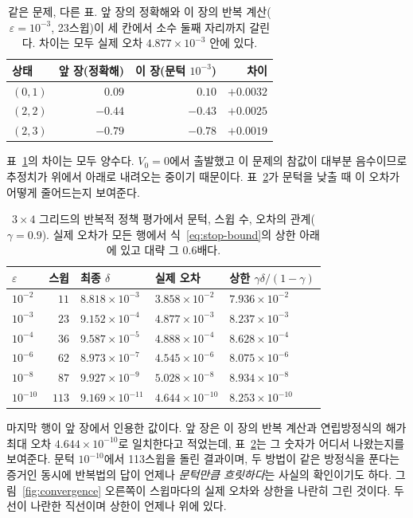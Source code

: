 \documentclass[11pt,a4paper]{article}
\begin{document}
\begin{table}[htbp]
\centering
\caption{같은 문제, 다른 표. 앞 장의 정확해와 이 장의 반복 계산($\varepsilon=10^{-3}$, 23스윕)이
세 칸에서 소수 둘째 자리까지 갈린다. 차이는 모두 실제 오차 $4.877\times10^{-3}$ 안에 있다.}
\label{tab:mismatch}
\small
\begin{tabular}{@{}lrrr@{}}
\toprule
상태 & 앞 장(정확해) & 이 장(문턱 $10^{-3}$) & 차이 \\
\midrule
$(0,1)$ & $0.09$  & $0.10$  & $+0.0032$ \\
$(2,2)$ & $-0.44$ & $-0.43$ & $+0.0025$ \\
$(2,3)$ & $-0.79$ & $-0.78$ & $+0.0019$ \\
\bottomrule
\end{tabular}
\end{table}

표~\ref{tab:mismatch}의 차이는 모두 양수다. $V_0=0$에서 출발했고 이 문제의 참값이 대부분 음수이므로
추정치가 위에서 아래로 내려오는 중이기 때문이다. 표~\ref{tab:threshold}가 문턱을 낮출 때 이 오차가
어떻게 줄어드는지 보여준다.

\begin{table}[htbp]
\centering
\caption{$3\times4$ 그리드의 반복적 정책 평가에서 문턱, 스윕 수, 오차의 관계($\gamma=0.9$).
실제 오차가 모든 행에서 식~\eqref{eq:stop-bound}의 상한 아래에 있고 대략 그 $0.6$배다.}
\label{tab:threshold}
\small
\begin{tabular}{@{}lrlll@{}}
\toprule
$\varepsilon$ & 스윕 & 최종 $\delta$ & 실제 오차 & 상한 $\gamma\delta/(1-\gamma)$ \\
\midrule
$10^{-2}$  & $11$  & $8.818\times10^{-3}$  & $3.858\times10^{-2}$  & $7.936\times10^{-2}$ \\
$10^{-3}$  & $23$  & $9.152\times10^{-4}$  & $4.877\times10^{-3}$  & $8.237\times10^{-3}$ \\
$10^{-4}$  & $36$  & $9.587\times10^{-5}$  & $4.888\times10^{-4}$  & $8.628\times10^{-4}$ \\
$10^{-6}$  & $62$  & $8.973\times10^{-7}$  & $4.545\times10^{-6}$  & $8.075\times10^{-6}$ \\
$10^{-8}$  & $87$  & $9.927\times10^{-9}$  & $5.028\times10^{-8}$  & $8.934\times10^{-8}$ \\
$10^{-10}$ & $113$ & $9.169\times10^{-11}$ & $4.644\times10^{-10}$ & $8.253\times10^{-10}$ \\
\bottomrule
\end{tabular}
\end{table}

마지막 행이 앞 장에서 인용한 값이다. 앞 장은 이 장의 반복 계산과 연립방정식의 해가 최대 오차
$4.644\times10^{-10}$로 일치한다고 적었는데, 표~\ref{tab:threshold}는 그 숫자가 어디서 나왔는지를
보여준다. 문턱 $10^{-10}$에서 113스윕을 돌린 결과이며, 두 방법이 같은 방정식을 푼다는 증거인 동시에
반복법의 답이 언제나 \emph{문턱만큼 흐릿하다}는 사실의 확인이기도 하다.
그림~\ref{fig:convergence} 오른쪽이 스윕마다의 실제 오차와 상한을 나란히 그린 것이다. 두 선이
나란한 직선이며 상한이 언제나 위에 있다.
\end{document}
